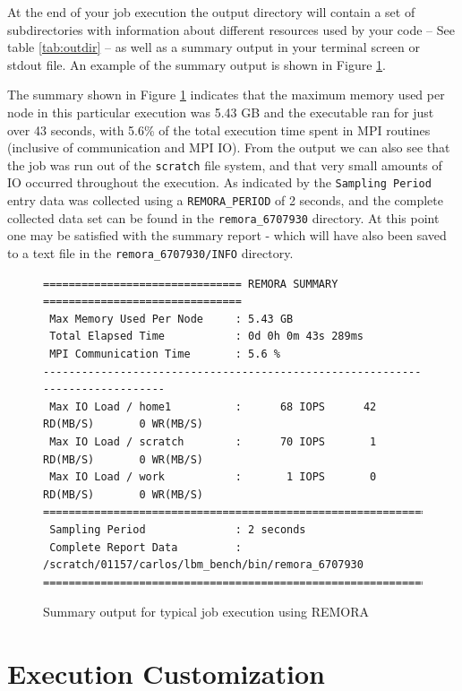 \documentclass[10pt,a4paper]{report}
\begin{document}
At the end of your job execution the output directory will contain a set of subdirectories with information about different resources used by your code -- See table \ref{tab:outdir} -- as well as a summary output in your terminal screen or stdout file. An example of the summary output is shown in Figure \ref{fig:summary}.

The summary shown in Figure \ref{fig:summary} indicates that the maximum memory used per node in this particular execution was 5.43 GB and the executable ran for just over 43 seconds, with 5.6\% of the total execution time spent in MPI routines (inclusive of communication and MPI IO). From the output we can also see that the job was run out of the \verb+scratch+ file system, and that very small amounts of IO occurred throughout the execution. As indicated by the \verb+Sampling Period+ entry data was collected using a \verb+REMORA_PERIOD+ of 2 seconds, and the complete collected data set can be found in the \verb+remora_6707930+ directory. At this point one may be satisfied with the summary report - which will have also been saved to a text file in the \verb+remora_6707930/INFO+ directory.

\begin{figure}
\begin{verbatim}
=============================== REMORA SUMMARY ===============================
 Max Memory Used Per Node     : 5.43 GB
 Total Elapsed Time           : 0d 0h 0m 43s 289ms
 MPI Communication Time       : 5.6 %
------------------------------------------------------------------------------
 Max IO Load / home1          :      68 IOPS      42 RD(MB/S)       0 WR(MB/S)
 Max IO Load / scratch        :      70 IOPS       1 RD(MB/S)       0 WR(MB/S)
 Max IO Load / work           :       1 IOPS       0 RD(MB/S)       0 WR(MB/S)
==============================================================================
 Sampling Period              : 2 seconds
 Complete Report Data         : /scratch/01157/carlos/lbm_bench/bin/remora_6707930
==============================================================================
\end{verbatim}
\caption{Summary output for typical job execution using REMORA}
\label{fig:summary}
\end{figure}

\FloatBarrier
\section{Execution Customization}\label{customize}
\end{document}
